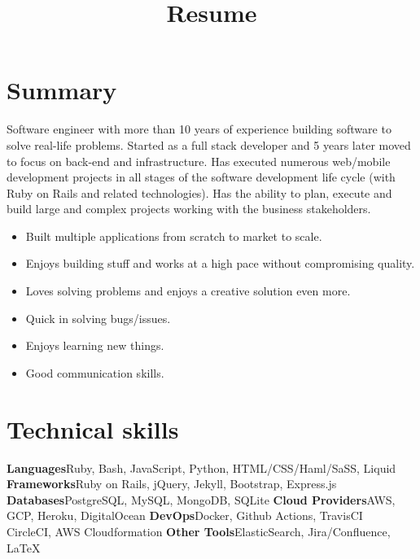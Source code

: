 \documentclass[11pt,a4paper]{moderncv}
\title{Resume}
\begin{document}
\maketitle


\section{Summary}

Software engineer with more than 10 years of experience building software to solve real-life problems. Started as a full stack developer and 5 years later moved to focus on back-end and infrastructure. Has executed numerous web/mobile development projects in all stages of the software development life cycle (with Ruby on Rails and related technologies). Has the ability to plan, execute and build large and complex projects working with the business stakeholders.

\vspace{10pt}
\begin{itemize}
    \setlength\itemsep{5pt}
    \item Built multiple applications from scratch to market to scale.
    \item Enjoys building stuff and works at a high pace without compromising quality.
    \item Loves solving problems and enjoys a creative solution even more.
    \item Quick in solving bugs/issues.
    \item Enjoys learning new things.
    \item Good communication skills.
    
\end{itemize}

\vspace{10pt}
\section{Technical skills}
\cvcomputer
{\textbf{Languages}}{Ruby, Bash, JavaScript, Python, HTML/CSS/Haml/SaSS, Liquid}
{\textbf{Frameworks}}{Ruby on Rails, jQuery, Jekyll, Bootstrap, Express.js}
\vspace{10pt}
\cvcomputer
{\textbf{Databases}}{PostgreSQL, MySQL, MongoDB, SQLite}
{\textbf{Cloud Providers}}{AWS, GCP, Heroku, DigitalOcean}
\vspace{10pt}
\cvcomputer
{\textbf{DevOps}}{Docker, Github Actions, TravisCI \\ CircleCI, AWS Cloudformation}
{\textbf{Other Tools}}{ElasticSearch, Jira/Confluence, \LaTeX}
\end{document}
